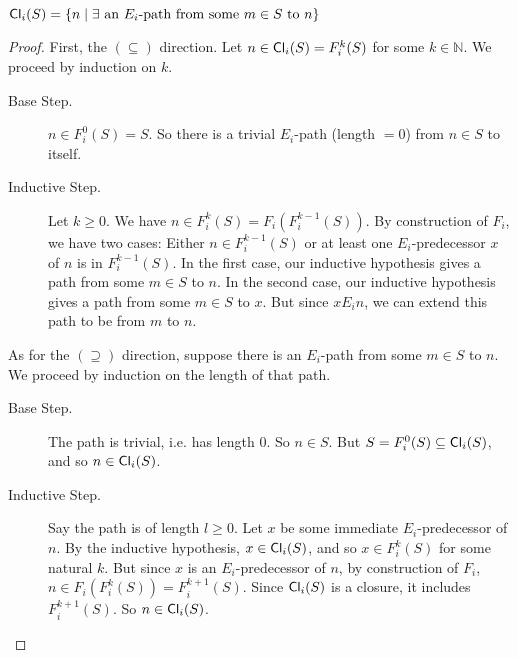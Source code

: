 \documentclass[letterpaper]{article}
\begin{document}
    \begin{claim*}
        $\mathsf{Cl}_i(S) = \{ n \mid \exists \mbox{ an } E_i\mbox{-path from some } m \in S \mbox{ to } n \}$
    \end{claim*}
    \begin{proof}
        First, the $(\subseteq)$ direction.  Let $n \in \mathsf{Cl}_i(S) = F^k_i(S)$ for some $k \in \mathbb{N}$.  We proceed by induction on $k$.
        \begin{description}
            \item[Base Step.] $n \in F^0_i(S) = S$.  So there is a trivial $E_i$-path (length $= 0$) from $n \in S$ to itself.
            
            \item[Inductive Step.] Let $k \geq 0$.  We have $n \in F^k_i(S) = F_i(F^{k-1}_i(S))$.  By construction of $F_i$, we have two cases:
            Either $n \in F^{k-1}_i(S)$ or at least one $E_i$-predecessor $x$ of $n$ is in $F^{k-1}_i(S)$.  In the first case, our inductive hypothesis gives a path from some $m \in S$ to $n$.  In the second case, our inductive hypothesis gives a path from some $m \in S$ to $x$.  But since $x{E_i}n$, we can extend this path to be from $m$ to $n$.
        \end{description}

        As for the $(\supseteq)$ direction, suppose there is an $E_i$-path from some $m \in S$ to $n$.  We proceed by induction on the length of that path.
        \begin{description}
            \item[Base Step.] The path is trivial, i.e. has length $0$.  So $n \in S$.  But $S = F^0_i(S) \subseteq \mathsf{Cl}_i(S)$, and so $n \in \mathsf{Cl}_i(S)$.
            
            \item[Inductive Step.] Say the path is of length $l \geq 0$.  Let $x$ be some immediate $E_i$-predecessor of $n$.  By the inductive hypothesis, $x \in \mathsf{Cl}_i(S)$, and so $x \in F^k_i(S)$ for some natural $k$.  But since $x$ is an $E_i$-predecessor of $n$, by construction of $F_i$, $n \in F_i(F^k_i(S)) = F^{k+1}_i(S)$.  Since $\mathsf{Cl}_i(S)$ is a closure, it includes $F^{k+1}_i(S)$.  So $n \in \mathsf{Cl}_i(S)$.
        \end{description}
    \end{proof}
\end{document}

